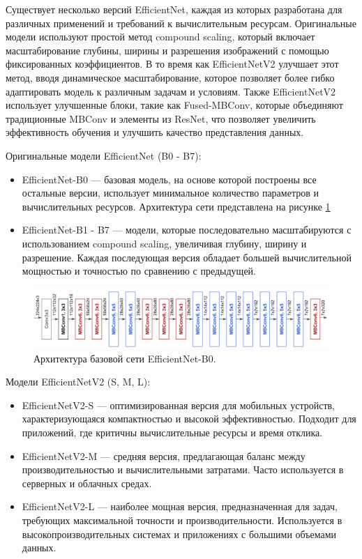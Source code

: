 \documentclass[a4paper,12pt]{extarticle}
\begin{document}
Существует несколько версий EfficientNet, каждая из которых разработана для различных применений и требований к вычислительным ресурсам. Оригинальные модели используют простой метод compound scaling, который включает масштабирование глубины, ширины и разрешения изображений с помощью фиксированных коэффициентов. В то время как EfficientNetV2 улучшает этот метод, вводя динамическое масштабирование, которое позволяет более гибко адаптировать модель к различным задачам и условиям. Также EfficientNetV2 использует улучшенные блоки, такие как Fused-MBConv, которые объединяют традиционные MBConv и элементы из ResNet, что позволяет увеличить эффективность обучения и улучшить качество представления данных.

Оригинальные модели EfficientNet (B0 - B7):
\begin{itemize}
\item EfficientNet-B0 — базовая модель, на основе которой построены все остальные версии, использует минимальное количество параметров и вычислительных ресурсов. Архитектура сети представлена на рисунке \ref{fig:efficientnet-b0}
\item EfficientNet-B1 - B7 — модели, которые последовательно масштабируются с использованием compound scaling, увеличивая глубину, ширину и разрешение. Каждая последующая версия обладает большей вычислительной мощностью и точностью по сравнению с предыдущей.
\end{itemize}

\begin{figure}[ht]
	\centering
	\includegraphics[scale=0.3]{efficientnet-b0.png}
	\caption{Архитектура базовой сети EfficientNet-B0\cite{efficient-b0}.}
	\label{fig:efficientnet-b0}
\end{figure}

Модели EfficientNetV2 (S, M, L):
\begin{itemize}
\item EfficientNetV2-S — оптимизированная версия для мобильных устройств, характеризующаяся компактностью и высокой эффективностью. Подходит для приложений, где критичны вычислительные ресурсы и время отклика.
\item EfficientNetV2-M — средняя версия, предлагающая баланс между производительностью и вычислительными затратами. Часто используется в серверных и облачных средах.
\item EfficientNetV2-L — наиболее мощная версия, предназначенная для задач, требующих максимальной точности и производительности. Используется в высокопроизводительных системах и приложениях с большими объемами данных.
\end{itemize}
\end{document}
